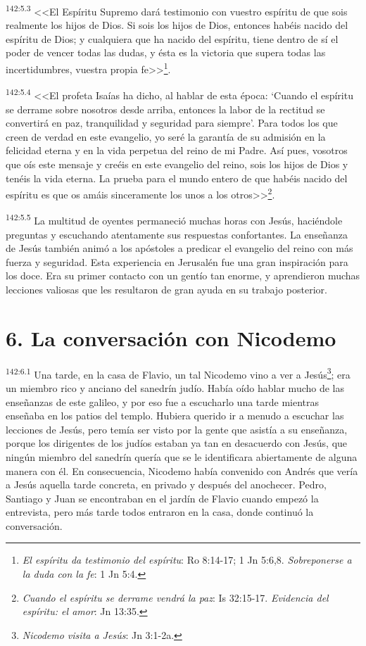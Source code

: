 \par 
\textsuperscript{142:5.3} <<El Espíritu Supremo dará testimonio con vuestro espíritu de que sois realmente los hijos de Dios. Si sois los hijos de Dios, entonces habéis nacido del espíritu de Dios; y cualquiera que ha nacido del espíritu, tiene dentro de sí el poder de vencer todas las dudas, y ésta es la victoria que supera todas las incertidumbres, vuestra propia fe>>\footnote{\textit{El espíritu da testimonio del espíritu}: Ro 8:14-17; 1 Jn 5:6,8. \textit{Sobreponerse a la duda con la fe}: 1 Jn 5:4.}.

\par 
\textsuperscript{142:5.4} <<El profeta Isaías ha dicho, al hablar de esta época: `Cuando el espíritu se derrame sobre nosotros desde arriba, entonces la labor de la rectitud se convertirá en paz, tranquilidad y seguridad para siempre'. Para todos los que creen de verdad en este evangelio, yo seré la garantía de su admisión en la felicidad eterna y en la vida perpetua del reino de mi Padre. Así pues, vosotros que oís este mensaje y creéis en este evangelio del reino, sois los hijos de Dios y tenéis la vida eterna. La prueba para el mundo entero de que habéis nacido del espíritu es que os amáis sinceramente los unos a los otros>>\footnote{\textit{Cuando el espíritu se derrame vendrá la paz}: Is 32:15-17. \textit{Evidencia del espíritu: el amor}: Jn 13:35.}.

\par 
\textsuperscript{142:5.5} La multitud de oyentes permaneció muchas horas con Jesús, haciéndole preguntas y escuchando atentamente sus respuestas confortantes. La enseñanza de Jesús también animó a los apóstoles a predicar el evangelio del reino con más fuerza y seguridad. Esta experiencia en Jerusalén fue una gran inspiración para los doce. Era su primer contacto con un gentío tan enorme, y aprendieron muchas lecciones valiosas que les resultaron de gran ayuda en su trabajo posterior.

\section*{6. La conversación con Nicodemo}
\par 
\textsuperscript{142:6.1} Una tarde, en la casa de Flavio, un tal Nicodemo vino a ver a Jesús\footnote{\textit{Nicodemo visita a Jesús}: Jn 3:1-2a.}; era un miembro rico y anciano del sanedrín judío. Había oído hablar mucho de las enseñanzas de este galileo, y por eso fue a escucharlo una tarde mientras enseñaba en los patios del templo. Hubiera querido ir a menudo a escuchar las lecciones de Jesús, pero temía ser visto por la gente que asistía a su enseñanza, porque los dirigentes de los judíos estaban ya tan en desacuerdo con Jesús, que ningún miembro del sanedrín quería que se le identificara abiertamente de alguna manera con él. En consecuencia, Nicodemo había convenido con Andrés que vería a Jesús aquella tarde concreta, en privado y después del anochecer. Pedro, Santiago y Juan se encontraban en el jardín de Flavio cuando empezó la entrevista, pero más tarde todos entraron en la casa, donde continuó la conversación.

